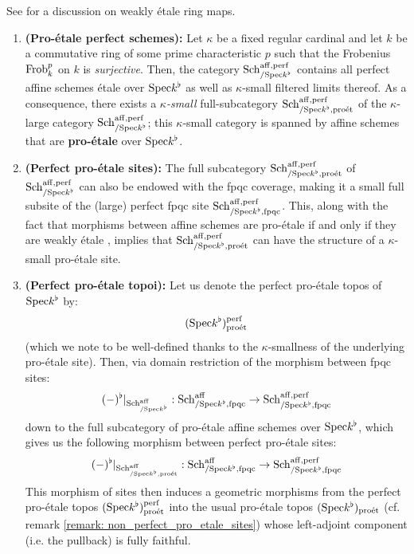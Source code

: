                     \begin{proposition} \label{prop: perfect_pro_etale_sites}
                        See \cite[\href{https://stacks.math.columbia.edu/tag/094N}{Tag 094N}]{stacks} for a discussion on weakly \'etale ring maps.
                        \begin{enumerate}
                            \item \textbf{(Pro-\'etale perfect schemes):} Let $\kappa$ be a fixed regular cardinal and let $k$ be a commutative ring of some prime characteristic $p$ such that the Frobenius $\mathrm{Frob}^p_k$ on $k$ is \textit{surjective}. Then, the category $\mathrm{Sch}^{\mathrm{aff}, \mathrm{perf}}_{/\mathrm{Spec} k^{\flat}}$ contains all perfect affine schemes \'etale over $\mathrm{Spec} k^{\flat}$ as well as $\kappa$-small filtered limits thereof. As a consequence, there exists a \textit{$\kappa$-small} full-subcategory $\mathrm{Sch}^{\mathrm{aff}, \mathrm{perf}}_{/\mathrm{Spec} k^{\flat}, \mathrm{pro\acute{e}t}}$ of the $\kappa$-large category $\mathrm{Sch}^{\mathrm{aff}, \mathrm{perf}}_{/\mathrm{Spec} k^{\flat}}$; this $\kappa$-small category is spanned by affine schemes that are \textbf{pro-\'etale} over $\mathrm{Spec} k^{\flat}$.
                            \item \textbf{(Perfect pro-\'etale sites):} The full subcategory $\mathrm{Sch}^{\mathrm{aff}, \mathrm{perf}}_{/\mathrm{Spec} k^{\flat}, \mathrm{pro\acute{e}t}}$ of $\mathrm{Sch}^{\mathrm{aff}, \mathrm{perf}}_{/\mathrm{Spec} k^{\flat}}$ can also be endowed with the fpqc coverage, making it a small full subsite of the (large) perfect fpqc site $\mathrm{Sch}^{\mathrm{aff}, \mathrm{perf}}_{/\mathrm{Spec} k^{\flat}, \mathrm{fpqc}}$. This, along with the fact that morphisms between affine schemes are pro-\'etale if and only if they are weakly \'etale \cite[Theorem 1.3]{bhatt_scholze_2014_pro_etale}, implies that $\mathrm{Sch}^{\mathrm{aff}, \mathrm{perf}}_{/\mathrm{Spec} k^{\flat}, \mathrm{pro\acute{e}t}}$ can have the structure of a $\kappa$-small pro-\'etale site.
                            \item \textbf{(Perfect pro-\'etale topoi):} Let us denote the perfect pro-\'etale topos of $\mathrm{Spec} k^{\flat}$ by:
                                $$(\mathrm{Spec} k^{\flat})^{\mathrm{perf}}_{\mathrm{pro\acute{e}t}}$$
                            (which we note to be well-defined thanks to the $\kappa$-smallness of the underlying pro-\'etale site). Then, via domain restriction of the morphism between fpqc sites:
                                $$(-)^{\flat}|_{\mathrm{Sch}^{\mathrm{aff}}_{/\mathrm{Spec} k^{\flat}}}: \mathrm{Sch}^{\mathrm{aff}}_{/\mathrm{Spec} k^{\flat}, \mathrm{fpqc}} \to \mathrm{Sch}^{\mathrm{aff}, \mathrm{perf}}_{/\mathrm{Spec} k^{\flat}, \mathrm{fpqc}}$$
                            down to the full subcategory of pro-\'etale affine schemes over $\mathrm{Spec} k^{\flat}$, which gives us the following morphism between perfect pro-\'etale sites:
                                $$(-)^{\flat}|_{\mathrm{Sch}^{\mathrm{aff}}_{/\mathrm{Spec} k^{\flat}, \mathrm{pro\acute{e}t}}}: \mathrm{Sch}^{\mathrm{aff}}_{/\mathrm{Spec} k^{\flat}, \mathrm{fpqc}} \to \mathrm{Sch}^{\mathrm{aff}, \mathrm{perf}}_{/\mathrm{Spec} k^{\flat}, \mathrm{fpqc}}$$
                            This morphism of sites then induces a geometric morphisms from the perfect pro-\'etale topos $(\mathrm{Spec} k^{\flat})^{\mathrm{perf}}_{\mathrm{pro\acute{e}t}}$ into the usual pro-\'etale topos $(\mathrm{Spec} k^{\flat})_{\mathrm{pro\acute{e}t}}$ (cf. remark \ref{remark: non_perfect_pro_etale_sites}) whose left-adjoint component (i.e. the pullback) is fully faithful.
                        \end{enumerate}
                    \end{proposition}
